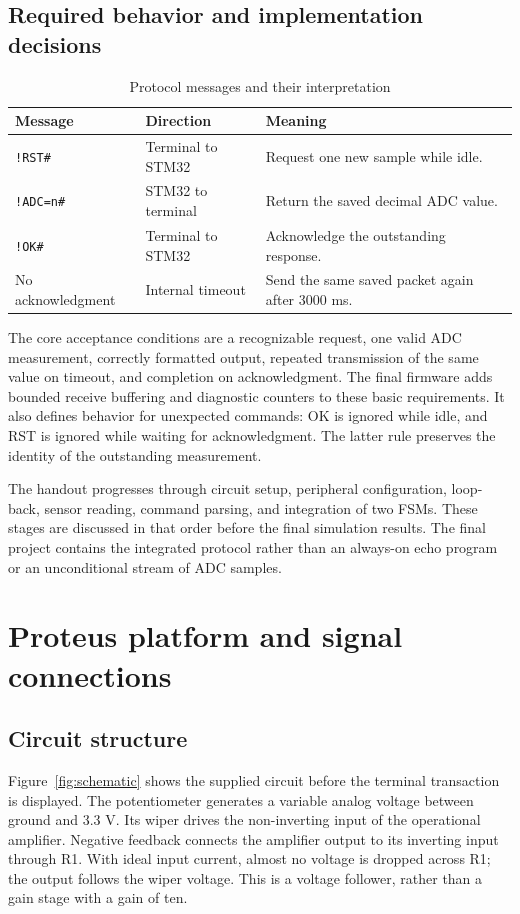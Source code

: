 \documentclass[a4paper]{article}
\newcommand{\topic}[1]{\subsection{#1}}
\begin{document}
\topic{Required behavior and implementation decisions}

\begin{table}[htbp]\centering\small
\caption{Protocol messages and their interpretation}
\begin{tabular}{p{25mm}p{38mm}p{83mm}}\toprule
Message & Direction & Meaning\\\midrule
\texttt{!RST\#} & Terminal to STM32 & Request one new sample while idle.\\
\texttt{!ADC=n\#} & STM32 to terminal & Return the saved decimal ADC value.\\
\texttt{!OK\#} & Terminal to STM32 & Acknowledge the outstanding response.\\
No acknowledgment & Internal timeout & Send the same saved packet again after 3000 ms.\\\bottomrule
\end{tabular}\end{table}

The core acceptance conditions are a recognizable request, one valid ADC
measurement, correctly formatted output, repeated transmission of the same
value on timeout, and completion on acknowledgment. The final firmware adds
bounded receive buffering and diagnostic counters to these basic requirements.
It also defines behavior for unexpected commands: OK is ignored while idle,
and RST is ignored while waiting for acknowledgment. The latter rule preserves
the identity of the outstanding measurement.

The handout progresses through circuit setup, peripheral configuration,
loop-back, sensor reading, command parsing, and integration of two FSMs.
These stages are discussed in that order before the final simulation results.
The final project contains the integrated protocol rather than an always-on
echo program or an unconditional stream of ADC samples.


\section{Proteus platform and signal connections}

\topic{Circuit structure}

Figure~\ref{fig:schematic} shows the supplied circuit before the terminal
transaction is displayed. The potentiometer generates a variable analog
voltage between ground and 3.3 V. Its wiper drives the non-inverting input
of the operational amplifier. Negative feedback connects the amplifier output
to its inverting input through R1. With ideal input current, almost no voltage
is dropped across R1; the output follows the wiper voltage. This is a voltage
follower, rather than a gain stage with a gain of ten.
\end{document}
